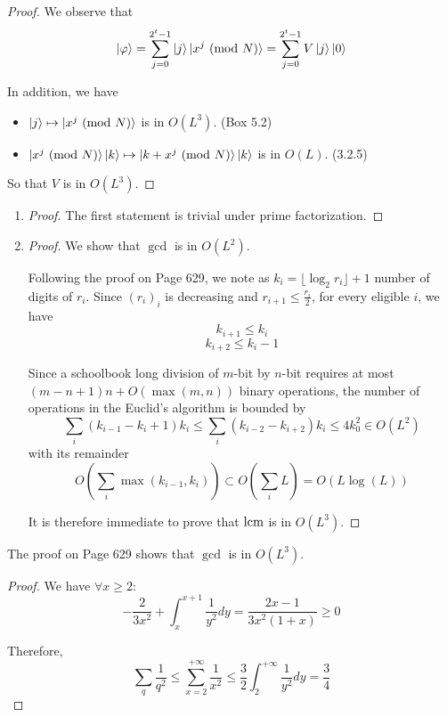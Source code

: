 \documentclass[../main.tex]{subfiles}
\begin{document}
\bigskip
\begin{exercise}
\end{exercise}
\begin{proof}
We observe that
\[
    \ket{\varphi}=\sum_{j=0}^{2^t-1}\ket{j}\ket{x^j\ (\mathrm{mod}\ N)}=\sum_{j=0}^{2^t-1}V\ket{j}\ket{0}
\]

In addition, we have
\begin{itemize}
    \item $\ket{j}\mapsto\ket{x^j\ (\mathrm{mod}\ N)}$ is in $O(L^3)$. (Box 5.2)
    \item $\ket{x^j\ (\mathrm{mod}\ N)}\ket{k}\mapsto\ket{k+x^j\ (\mathrm{mod}\ N)}\ket{k}$ is in $O(L)$. (3.2.5)
\end{itemize}

So that $V$ is in $O(L^3)$.
\end{proof}

\bigskip
\begin{exercise}
\end{exercise}
\begin{enumerate}
    \item \begin{proof}
    The first statement is trivial under prime factorization.
    \end{proof}
    \item \begin{proof}
    We show that $\gcd$ is in $O(L^2)$. 
    
    Following the proof on Page 629, we note as $k_i=\lfloor\log_2 r_i\rfloor+1$ number of digits of $r_i$. Since $(r_i)_i$ is decreasing and $r_{i+1}\leq \frac{r_i}{2}$, for every eligible $i$, we have
    \[
        k_{i+1}\leq k_i
    \]
    \[
        k_{i+2}\leq k_i-1
    \]
    
    Since a schoolbook long division of $m$-bit by $n$-bit requires at most $(m-n+1)n+O(\max(m,n))$ binary operations, the number of operations in the Euclid's algorithm is bounded by
    \[
        \sum_{i}(k_{i-1}-k_i+1)k_i\leq\sum_i(k_{i-2}-k_{i+2})k_i\leq 4k_0^2\in O(L^2)
    \]
    with its remainder
    \[
        O(\sum_{i}\max(k_{i-1},k_i))\subset O(\sum_i L)=O(L\log(L))
    \]
    
    It is therefore immediate to prove that $\operatorname{lcm}$ is in $O(L^3)$.
    \end{proof}
\end{enumerate}
\begin{remark}
The proof on Page 629 shows that $\gcd$ is in $O(L^3)$.
\end{remark}

\bigskip
\begin{exercise}
\end{exercise}
\begin{proof}
We have $\forall x\geq2$:
\[
    -\frac{2}{3x^2}+\int_{x}^{x+1}\frac{1}{y^2}d y=\frac{2x-1}{3x^2(1+x)}\geq0
\] 

Therefore,
\[
    \sum_q\frac{1}{q^2}\leq\sum_{x=2}^{+\infty}\frac{1}{x^2}\leq\frac{3}{2}\int_2^{+\infty}\frac{1}{y^2}d y=\frac{3}{4}
\]
\end{proof}
\end{document}
